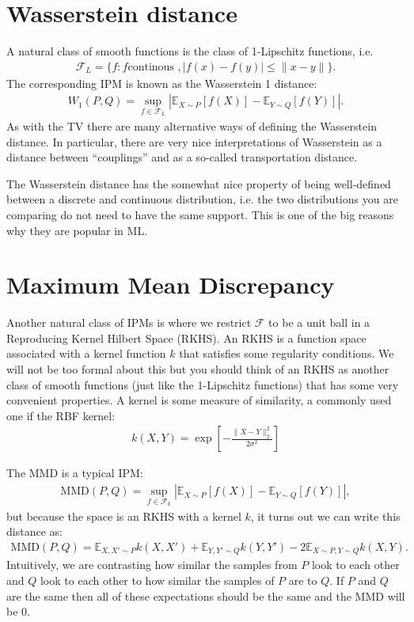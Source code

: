 \documentclass[twoside,12pt]{article}
\begin{document}
\section{Wasserstein distance}
A natural class of smooth functions is the class of 1-Lipschitz functions, i.e.
\begin{align*}
\mathcal{F}_L = \{f: f \text{continous }, |f(x) - f(y)| \leq \|x - y\| \}.
\end{align*}
The corresponding IPM is known as the Wasserstein 1 distance:
\begin{align*}
W_1(P,Q) = \sup_{f \in \mathcal{F}_L} |\mathbb{E}_{X \sim P} [f(X)] - \mathbb{E}_{Y \sim Q} [f(Y)]|.
\end{align*}
As with the TV there are many alternative ways of defining the Wasserstein distance. In particular, there are very nice interpretations of Wasserstein as a distance between ``couplings'' and as a so-called transportation distance.

The Wasserstein distance has the somewhat nice property of being well-defined between a discrete and continuous distribution, i.e. the two distributions you are comparing do not need to have the same support. This is one of the big reasons why they are popular in ML.

\section{Maximum Mean Discrepancy}
Another natural class of IPMs is where we restrict $\mathcal{F}$ to be a unit ball in a Reproducing Kernel Hilbert Space (RKHS). An RKHS is a function space associated with a kernel function $k$ that satisfies some regularity conditions. We will not be too formal about this but you should think of an RKHS as another class of smooth functions (just like the 1-Lipschitz functions) that has some very convenient properties. A kernel is some measure of similarity, a commonly used one if the RBF kernel:
\begin{align*}
k(X,Y) = \exp \left[ -  \frac{\|X - Y\|_2^2}{2\sigma^2} \right]
\end{align*}

The MMD is a typical IPM:
\begin{align*}
\text{MMD}(P,Q) = \sup_{f \in \mathcal{F}_k} |\mathbb{E}_{X \sim P} [f(X)] - \mathbb{E}_{Y \sim Q} [f(Y)]|,
\end{align*}
but because the space is an RKHS with a kernel $k$, it turns out we can write this distance as:
\begin{align*}
\text{MMD}(P,Q) = \mathbb{E}_{X,X' \sim P} k(X,X') + \mathbb{E}_{Y,Y' \sim Q} k(Y,Y')
- 2 \mathbb{E}_{X \sim P, Y \sim Q} k(X,Y).
\end{align*}
Intuitively, we are contrasting how similar the samples from $P$ look to each other and $Q$ look to each other to how similar the samples of $P$ are to $Q$. If $P$ and $Q$ are the same then all of these expectations should be the same and the MMD will be 0.
\end{document}
